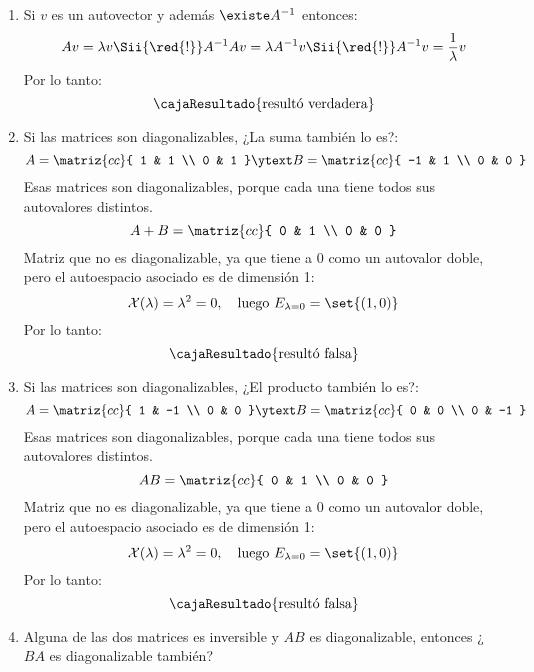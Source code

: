 \begin{enumerate}[label=(\alph*)]
	\item Si $v$ es un autovector y además $\existe A^{-1}$ entonces:
	      $$
		      Av = \lambda v
		      \Sii{\red{!}}
		      A^{-1}Av = \lambda A^{-1}v
		      \Sii{\red{!}}
		      A^{-1}v = \frac{1}{\lambda} v
	      $$
	      Por lo tanto:
	      $$
		      \cajaResultado{
			      \text{resultó verdadera}
		      }
	      $$

	\item Si las matrices son diagonalizables, ¿La suma también lo es?:
	      $$
		      A =
		      \matriz{cc}{
			      1 & 1 \\
			      0 & 1
		      }
		      \ytext
		      B =
		      \matriz{cc}{
			      -1 & 1 \\
			      0 & 0
		      }
	      $$
	      Esas matrices son diagonalizables, porque cada una tiene todos sus autovalores distintos.
	      $$
		      A + B =
		      \matriz{cc}{
			      0 & 1 \\
			      0 & 0
		      }
	      $$
	      Matriz que no es diagonalizable, ya que tiene a $0$ como un autovalor doble, pero el autoespacio asociado es de dimensión 1:
	      $$
		      \mathcal{X}(\lambda) = \lambda^2 = 0, \quad \text{luego } E_{\lambda = 0} = \set{(1,0)}
	      $$
	      Por lo tanto:
	      $$
		      \cajaResultado{
			      \text{resultó falsa}
		      }
	      $$

	\item Si las matrices son diagonalizables, ¿El producto también lo es?:
	      $$
		      A =
		      \matriz{cc}{
			      1 & -1 \\
			      0 & 0
		      }
		      \ytext
		      B =
		      \matriz{cc}{
			      0 & 0 \\
			      0 & -1
		      }
	      $$
	      Esas matrices son diagonalizables, porque cada una tiene todos sus autovalores distintos.
	      $$
		      A B =
		      \matriz{cc}{
			      0 & 1 \\
			      0 & 0
		      }
	      $$
	      Matriz que no es diagonalizable, ya que tiene a $0$ como un autovalor doble, pero el autoespacio asociado es de dimensión 1:
	      $$
		      \mathcal{X}(\lambda) = \lambda^2 = 0, \quad \text{luego } E_{\lambda = 0} = \set{(1,0)}
	      $$
	      Por lo tanto:
	      $$
		      \cajaResultado{
			      \text{resultó falsa}
		      }
	      $$

	\item Alguna de las dos matrices es inversible y $AB$ es diagonalizable, entonces ¿$BA$ es diagonalizable también?


\end{enumerate}
